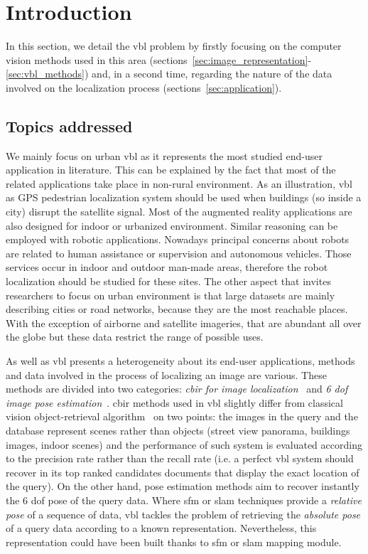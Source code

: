 \section{Introduction}
\label{sec:introduction}
	
	In this section, we detail the \ac{vbl} problem by firstly focusing on the computer vision methods used in this area (sections~\ref{sec:image_representation}-\ref{sec:vbl_methods}) and, in a second time, regarding the nature of the data involved on the localization process (sections~\ref{sec:application}).
	
	\subsection{Topics addressed}
		We mainly focus on urban \ac{vbl} as it represents the most studied end-user application in literature. This can be explained by the fact that most of the related applications take place in non-rural environment. As an illustration, \ac{vbl} as GPS pedestrian localization system should be used when buildings (so inside a city) disrupt the satellite signal. Most of the augmented reality applications are also designed for indoor or urbanized environment. Similar reasoning can be employed with robotic applications. Nowadays principal concerns about robots are related to human assistance or supervision and autonomous vehicles. Those services occur in indoor and outdoor man-made areas, therefore the robot localization should be studied for these sites. The other aspect that invites researchers to focus on urban environment is that large datasets are mainly describing cities or road networks, because they are the most reachable places. With the exception of airborne and satellite imageries, that are abundant all over the globe but these data restrict the range of possible uses.
				
		As well as \ac{vbl} presents a heterogeneity about its end-user applications, methods and data involved in the process of localizing an image are various. These methods are divided into two categories: \textit{\ac{cbir} for image localization}~\citep{Arandjelovic2012,Radenovic2016,Liu2018} and \textit{6 \ac{dof} image pose estimation}~\citep{Sattler2016a, Brachmann2017b,Sarlin2018a}. \ac{cbir} methods used in \ac{vbl} slightly differ from classical vision object-retrieval algorithm~\citep{Sivic2003} on two points: the images in the query and the database represent scenes rather than objects (\eg street view panorama, buildings images, indoor scenes) and the performance of such system is evaluated according to the precision rate rather than the recall rate (i.e. a perfect \ac{vbl} system should recover in its top ranked candidates documents that display the exact location of the query). On the other hand, pose estimation methods aim to recover instantly the 6 \ac{dof} pose of the query data. Where \ac{sfm} or \ac{slam} techniques provide a \textit{relative pose} of a sequence of data, \ac{vbl} tackles the problem of retrieving the \textit{absolute pose} of a query data according to a known representation. Nevertheless, this representation could have been built thanks to \ac{sfm} or \ac{slam} mapping module.
			
